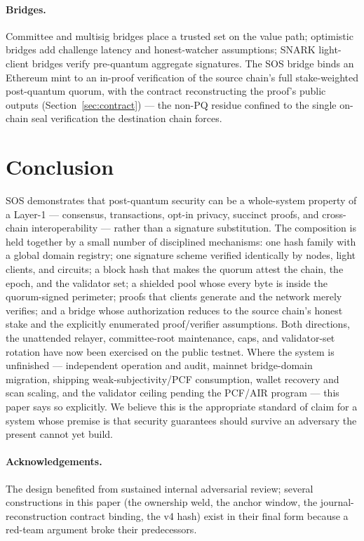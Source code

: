 \documentclass[11pt]{article}
\theoremstyle{plain}
\theoremstyle{definition}
\theoremstyle{remark}
\begin{document}
\paragraph{Bridges.} Committee and multisig bridges place a trusted set on
the value path; optimistic bridges add challenge latency and honest-watcher
assumptions; SNARK light-client bridges \cite{succinct2022} verify
pre-quantum aggregate signatures. The SOS bridge binds an Ethereum mint to
an in-proof verification of the source chain's full stake-weighted
post-quantum quorum, with the contract reconstructing the proof's public
outputs (Section~\ref{sec:contract}) --- the non-PQ residue confined to the
single on-chain seal verification the destination chain forces.

\section{Conclusion}
\label{sec:conclusion}

SOS demonstrates that post-quantum security can be a whole-system property
of a Layer-1 --- consensus, transactions, opt-in privacy, succinct proofs,
and cross-chain interoperability --- rather than a signature substitution.
The composition is held together by a small number of disciplined
mechanisms: one hash family with a global domain registry; one signature
scheme verified identically by nodes, light clients, and circuits; a block
hash that makes the quorum attest the chain, the epoch, and the validator
set; a shielded pool whose every byte is inside the quorum-signed
perimeter; proofs that clients generate and the network merely verifies;
and a bridge whose authorization reduces to the source chain's honest stake
and the explicitly enumerated proof/verifier assumptions. Both directions,
the unattended relayer, committee-root maintenance, caps, and validator-set
rotation have now been exercised on the public testnet. Where the system is
unfinished --- independent operation and audit, mainnet bridge-domain
migration, shipping weak-subjectivity/PCF consumption, wallet recovery and
scan scaling, and the validator ceiling pending the PCF/AIR program --- this
paper says so explicitly. We believe
this is the appropriate standard of claim for a system whose premise is
that security guarantees should survive an adversary the present cannot
yet build.

\paragraph{Acknowledgements.} The design benefited from sustained internal
adversarial review; several constructions in this paper (the ownership
weld, the anchor window, the journal-reconstruction contract binding, the
v4 hash) exist in their final form because a red-team argument broke their
predecessors.
\end{document}
